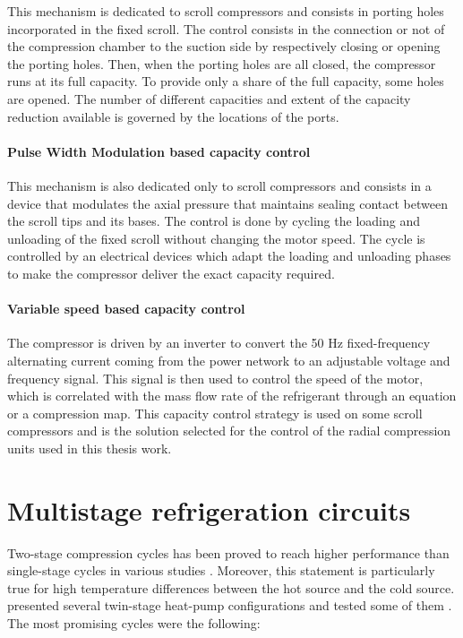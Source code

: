 This mechanism is dedicated to scroll compressors and consists in
porting holes incorporated in the fixed scroll. The control consists
in the connection or not of the compression chamber to the suction
side by respectively closing or opening the porting holes. Then, when
the porting holes are all closed, the compressor runs at its full
capacity. To provide only a share of the full capacity, some holes are
opened. The number of different capacities and extent of the capacity
reduction available is governed by the locations of the ports.

\paragraph{Pulse Width Modulation based capacity control}

This mechanism is also dedicated only to scroll compressors and
consists in a device that modulates the axial pressure that maintains
sealing contact between the scroll tips and its bases. The control is
done by cycling the loading and unloading of the fixed scroll without
changing the motor speed.  The cycle is controlled by an electrical
devices which adapt the loading and unloading phases to make the
compressor deliver the exact capacity required.

\paragraph{Variable speed based capacity control}

The compressor is driven by an inverter to convert the 50 Hz
fixed-frequency alternating current coming from the power network to
an adjustable voltage and frequency signal. This signal is then used
to control the speed of the motor, which is correlated with the mass
flow rate of the refrigerant through an equation or a compression
map. This capacity control strategy is used on some scroll compressors
and is the solution selected for the control of the radial compression
units used in this thesis work.

\section{Multistage refrigeration circuits}
\label{sec:sota-multistage}

Two-stage compression cycles has been proved to reach higher
performance than single-stage cycles in various studies
\citep{Favrat-Courtin-1997a,Zehnder-2004a}. Moreover, this statement
is particularly true for high temperature differences between the hot
source and the cold source. \citet{Zehnder-2004a} presented several
twin-stage heat-pump configurations and tested some of them
\citep{Zehnder-Favrat-1998a,Zehnder-Perevozchikow-2002a}. The most promising cycles were the
following:

